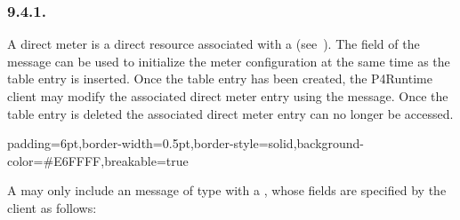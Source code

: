 \documentclass[11pt]{article}
\begin{document}
{%
\subsubsection{9.4.1.\hspace*{0.5em}}\label{sec-directmeterentry}%

\noindent{}A direct meter is a direct resource associated with a  (see~). The  field of the 
message can be used to initialize the meter configuration at the same time as
the table entry is inserted. Once the table entry has been created, the
P4Runtime client may modify the associated direct meter entry using the
 message. Once the table entry is deleted the associated
direct meter entry can no longer be accessed.%

\begin{mdbmargintb}{6pt}{6pt}%
\begin{mdblock}{padding=6pt,border-width=0.5pt,border-style=solid,background-color=\#E6FFFF,breakable=true}%
\begin{mdpre}%
\end{mdpre}%
\end{mdblock}%
\end{mdbmargintb}%

\noindent{}A  may only include an  message of type  with a
, whose fields are specified by the client as follows:%

}
\end{document}
